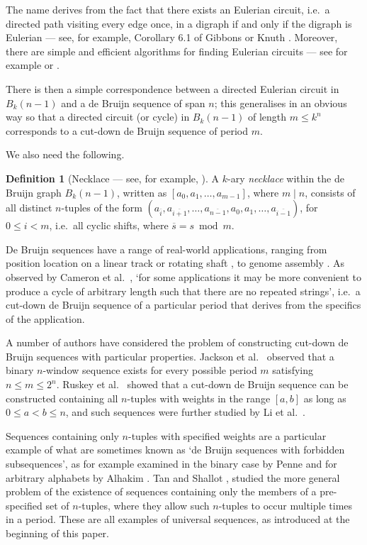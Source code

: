 \documentclass[a4paper,11pt]{article}
\theoremstyle{plain}
\theoremstyle{definition}
\newtheorem{definition}{Definition}[section]
\theoremstyle{remark}
\begin{document}
The name derives from the fact that there exists an Eulerian circuit, i.e.\ a directed path
visiting every edge once, in a digraph if and only if the digraph is Eulerian --- see, for example,
Corollary 6.1 of Gibbons \cite{Gibbons85} or Knuth \cite[Section 2.3.4.2, Theorem G]{Knuth97}.
Moreover, there are simple and efficient algorithms for finding Eulerian circuits --- see for
example \cite[Figure 6.5]{Gibbons85} or \cite[Section 2.3.4.2, Theorem D]{Knuth97}.

There is then a simple correspondence between a directed Eulerian circuit in $B_k(n-1)$ and a de
Bruijn sequence of span $n$; this generalises in an obvious way so that a directed circuit (or
cycle) in $B_k(n-1)$ of length $m\leq k^n$ corresponds to a cut-down de Bruijn sequence of period
$m$.

We also need the following.

\begin{definition}[Necklace --- see, for example, \cite{Ruskey92}]
A $k$-ary \emph{necklace} within the de Bruijn graph $B_k(n-1)$, written as
$[a_0,a_1,\dots,a_{m-1}]$, where $m\mid n$, consists of all distinct $n$-tuples of the form
$(a_{\overline{i}},a_{\overline{i+1}},\dots,a_{\overline{n-1}},a_0,a_1,\dots,a_{\overline{i-1}})$,
for $0\leq i<m$, i.e.\ all cyclic shifts, where $\overline{s}=s\bmod m$.
\end{definition}

De Bruijn sequences have a range of real-world applications, ranging from position location on a
linear track or rotating shaft \cite{Burns92,Burns93,Peng23,Petriu98,Yamaguchi05}, to genome
assembly \cite{Compeau11}. As observed by Cameron et al.\ \cite{Cameron25}, `for some applications
it may be more convenient to produce a cycle of arbitrary length such that there are no repeated
strings', i.e.\ a cut-down de Bruijn sequence of a particular period that derives from the
specifics of the application.

A number of authors have considered the problem of constructing cut-down de Bruijn sequences with
particular properties. Jackson et al.\ \cite[Problem 477]{Jackson09} observed that a binary
$n$-window sequence exists for every possible period $m$ satisfying $n\leq m\leq2^n$. Ruskey et
al.\ \cite{Ruskey12} showed that a cut-down de Bruijn sequence can be constructed containing all
$n$-tuples with weights in the range $[a,b]$ as long as $0\leq a<b\leq n$, and such sequences were
further studied by Li et al.\ \cite{Li23}.

Sequences containing only $n$-tuples with specified weights are a particular example of what are
sometimes known as `de Bruijn sequences with forbidden subsequences', as for example examined in
the binary case by Penne \cite{Penne10} and for arbitrary alphabets by Alhakim \cite{Alhakim22}.
Tan and Shallot \cite{Tan13}, studied the more general problem of the existence of sequences
containing only the members of a pre-specified set of $n$-tuples, where they allow such $n$-tuples
to occur multiple times in a period. These are all examples of universal sequences, as introduced
at the beginning of this paper.
\end{document}
